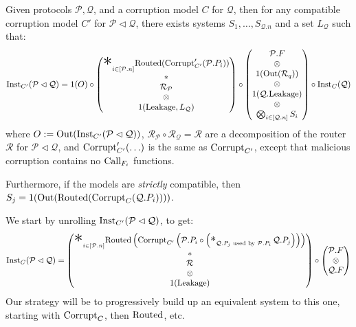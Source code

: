 \begin{theorem}
  \label{thm:horizontal_breakdown}
  Given protocols $\mathcal{P}, \mathcal{Q}$, and a corruption
  model $C$ for $\mathcal{Q}$, then for any compatible corruption
  model $C'$ for $\mathcal{P} \lhd \mathcal{Q}$, there exists
  systems $S_1, \ldots, S_{\mathcal{Q}.n}$ and a set $L_{\mathcal{Q}}$ such that:
  $$
  \tx{Inst}_{C'}(\mathcal{P} \lhd \mathcal{Q}) =
  1(O)\circ
  \begin{pmatrix}
    {\displaystyle \bigast}_{i \in [\mathcal{P}.n]} \tx{Routed}(\tx{Corrupt}'_{C'}(\mathcal{P}.P_i))
    \cr
    *\cr
    \mathcal{R}_{\mathcal{P}}\cr
    \otimes\cr
    1(\tx{Leakage}, L_{\mathcal{Q}})
  \end{pmatrix}
  \circ
  \begin{pmatrix}
    \mathcal{P}.F\cr
    \otimes\cr
    1(\tx{Out}(\mathcal{R}_q))\cr
    \otimes\cr
    1(\mathcal{Q}.\tx{Leakage})\cr
    \otimes\cr
    \bigotimes_{i \in [\mathcal{Q}.n]} S_i\cr
  \end{pmatrix}
  \circ
  \tx{Inst}_C(\mathcal{Q})
  $$
  where $O := \text{Out}(\text{Inst}_{C'}(\mathcal{P} \lhd \mathcal{Q}))$,
  $\mathcal{R}_{\mathcal{P}} \circ \mathcal{R}_{\mathcal{Q}} = \mathcal{R}$
  are a decomposition of the router $\mathcal{R}$ for $\mathcal{P} \lhd \mathcal{Q}$,
  and $\text{Corrupt}'_{C'}(\ldots)$ is the same as $\text{Corrupt}_{C'}$,
  except that malicious corruption contains no $\text{Call}_{F_i}$ functions.

  Furthermore, if the models are \emph{strictly} compatible,
  then $S_j = 1(\text{Out}(\text{Routed}(\text{Corrupt}_C(\mathcal{Q}.P_i))))$.

 We start by unrolling $\text{Inst}_{C'}(\mathcal{P} \lhd \mathcal{Q})$,
to get:
\[
\tx{Inst}_C(\mathcal{P} \lhd \mathcal{Q}) =
  \begin{pmatrix}
    {\displaystyle \bigast}_{i \in [\mathcal{P}.n]} \tx{Routed}\left(\tx{Corrupt}_{C'}\left(\mathcal{P}.P_i \circ 
        \left( \bigast_{\mathcal{Q}.P_j \tx{ used by } \mathcal{P}.P_i} \mathcal{Q}.P_j \right)
    \right)\right)\cr
    *\cr
    \mathcal{R}\cr
    \otimes\cr
    1(\tx{Leakage})
  \end{pmatrix}
  \circ \begin{pmatrix}
    \mathcal{P}.F\cr
    \otimes \cr
    \mathcal{Q}.F
  \end{pmatrix}
\]
Our strategy will be to progressively build up an equivalent system
to this one, starting with $\text{Corrupt}_C$, then $\text{Routed}$, etc.


\end{theorem}
